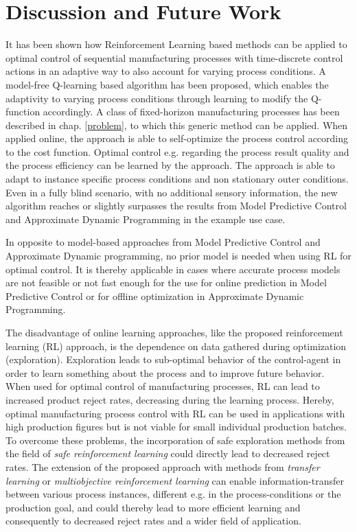 \section{Discussion and Future Work}
\label{discussion}

It has been shown how Reinforcement Learning based methods can be applied to optimal control of sequential manufacturing processes with time-discrete control actions in an adaptive way to also account for varying process conditions. A model-free Q-learning based algorithm has been proposed, which enables the adaptivity to varying process conditions through learning to modify the Q-function accordingly. A class of fixed-horizon manufacturing processes has been described in chap. \ref{problem}, to which this generic method can be applied. When applied online, the approach is able to self-optimize the process control according to the cost function. Optimal control e.g. regarding the process result quality and the process efficiency can be learned by the approach. The approach is able to adapt to instance specific process conditions and non stationary outer conditions. Even in a fully blind scenario, with no additional sensory information, the new algorithm reaches or slightly surpasses the results from Model Predictive Control and Approximate Dynamic Programming in the example use case. 

In opposite to model-based approaches from Model Predictive Control and Approximate Dynamic programming, no prior model is needed when using RL for optimal control. It is thereby applicable in cases where accurate process models are not feasible or not fast enough for the use for online prediction in Model Predictive Control or for offline optimization in Approximate Dynamic Programming. 

The disadvantage of online learning approaches, like the proposed reinforcement learning (RL) approach, is the dependence on data gathered during optimization (exploration). Exploration leads to sub-optimal behavior of the control-agent in order to learn something about the process and to improve future behavior. When used for optimal control of manufacturing processes, RL can lead to increased product reject rates, decreasing during the learning process. Hereby, optimal manufacturing process control with RL can be used in applications with high production figures but is not viable for small individual production batches. To overcome these problems, the incorporation of safe exploration methods from the field of \textit{safe reinforcement learning} could directly lead to decreased reject rates. The extension of the proposed approach with methods from \textit{transfer learning} or \textit{multiobjective reinforcement learning} can enable information-transfer between various process instances, different e.g. in the process-conditions or the production goal, and could thereby lead to more efficient learning and consequently to decreased reject rates and a wider field of application.

